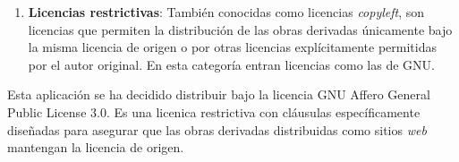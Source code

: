 \begin{enumerate}
	\item \textbf{Licencias restrictivas}: También conocidas como licencias \textit{copyleft}, son licencias que permiten la distribución de las obras derivadas únicamente bajo la misma licencia de origen o por otras licencias explícitamente permitidas por el autor original. En esta categoría entran licencias como las de GNU.
\end{enumerate}

Esta aplicación se ha decidido distribuir bajo la licencia GNU Affero General Public License 3.0. Es una licenica restrictiva con cláusulas específicamente diseñadas para asegurar que las obras derivadas distribuidas como sitios \textit{web} mantengan la licencia de origen. \citationNeeded
